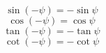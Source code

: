 \begin{multicols}{2}
                    
                        $$ \sin\left(-\psi\right) = -\sin\psi $$
                        $$ \cos\left(-\psi\right) = \cos\psi $$                  
                        $$ \tan\left(-\psi\right) = -\tan\psi $$
                        $$ \cot\left(-\psi\right) = -\cot\psi $$       
                      

                \end{multicols}
    
    
        




                            
